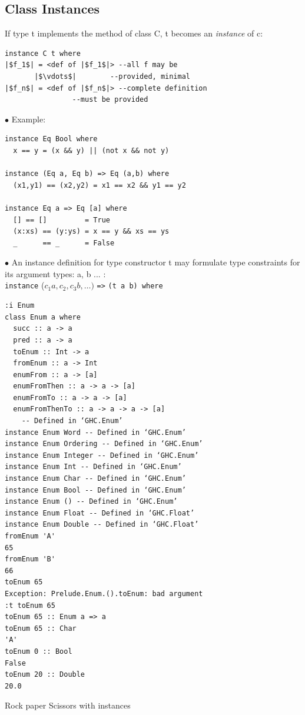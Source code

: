 \documentclass{article}
\newcommand{\Haskell}[1]{\texttt{#1}}
\begin{document}
\subsection{Class Instances}
If type t implements the method of class C, t becomes an \emph{instance} of c:
\begin{verbatim}
instance C t where
|$f_1$| = <def of |$f_1$|> --all f may be
       |$\vdots$|        --provided, minimal
|$f_n$| = <def of |$f_n$|> --complete definition
                --must be provided
\end{verbatim}
$\bullet$ Example:\\
\begin{verbatim}
instance Eq Bool where
  x == y = (x && y) || (not x && not y)

instance (Eq a, Eq b) => Eq (a,b) where
  (x1,y1) == (x2,y2) = x1 == x2 && y1 == y2

instance Eq a => Eq [a] where
  [] == []         = True
  (x:xs) == (y:ys) = x == y && xs == ys
  _      == _      = False

\end{verbatim}
$\bullet$ An instance definition for type constructor t may formulate type constraints for its argument types: a, b ... :\\
\Haskell{instance} ($c_1a,c_2,c_3b,\ldots)$ \Haskell{=>} 
 \Haskell{(t a b) where}\\
\begin{verbatim}
:i Enum
class Enum a where
  succ :: a -> a
  pred :: a -> a
  toEnum :: Int -> a
  fromEnum :: a -> Int
  enumFrom :: a -> [a]
  enumFromThen :: a -> a -> [a]
  enumFromTo :: a -> a -> [a]
  enumFromThenTo :: a -> a -> a -> [a]
  	-- Defined in ‘GHC.Enum’
instance Enum Word -- Defined in ‘GHC.Enum’
instance Enum Ordering -- Defined in ‘GHC.Enum’
instance Enum Integer -- Defined in ‘GHC.Enum’
instance Enum Int -- Defined in ‘GHC.Enum’
instance Enum Char -- Defined in ‘GHC.Enum’
instance Enum Bool -- Defined in ‘GHC.Enum’
instance Enum () -- Defined in ‘GHC.Enum’
instance Enum Float -- Defined in ‘GHC.Float’
instance Enum Double -- Defined in ‘GHC.Float’
fromEnum 'A'
65
fromEnum 'B'
66
toEnum 65
Exception: Prelude.Enum.().toEnum: bad argument
:t toEnum 65
toEnum 65 :: Enum a => a
toEnum 65 :: Char
'A'
toEnum 0 :: Bool
False
toEnum 20 :: Double
20.0
\end{verbatim}
\begin{listing}
\caption{Rock paper Scissors with instances}
\inputminted{Haskell}{RockPaperScissor-inheritance.hs}
\end{listing}
\end{document}
